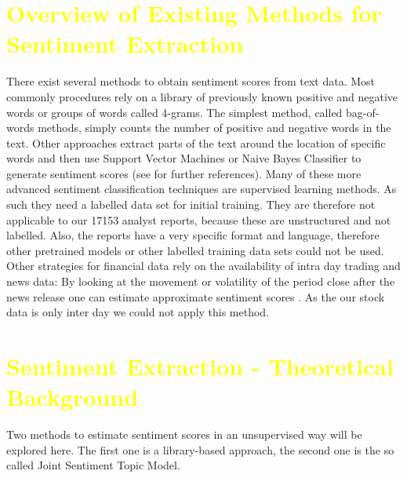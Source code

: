\section{\textcolor{yellow}{Overview of Existing Methods for Sentiment Extraction}}
There exist several methods to obtain sentiment scores from text data. Most commonly procedures rely on a library of previously known positive and negative words or groups of words called 4-grams. The simplest method, called bag-of-words methods, simply counts the number of positive and negative words in the text. Other approaches extract parts of the text around the location of specific words and then use Support Vector Machines or Naive Bayes Classifier to generate sentiment scores (see \citet{westerski2007sentiment} for further references). Many of these more advanced sentiment classification techniques are supervised learning methods. As such they need a labelled data set for initial training. They are therefore not applicable to our 17153 analyst reports, because these are unstructured and not labelled. Also, the reports have a very specific format and language, therefore other pretrained models or other labelled training data sets could not be used. Other strategies for financial data rely on the availability of intra day trading and news data: By looking at the movement or volatility of the period close after the news release one can estimate approximate sentiment scores \citep{robertson2007news}. As the our stock data is only inter day we could not apply this method.
\\
\section{\textcolor{yellow}{Sentiment Extraction - Theoretical Background}}
Two methods to estimate sentiment scores in an unsupervised way will be explored here. The first one is a library-based approach, the second one is the so called Joint Sentiment Topic Model. 

